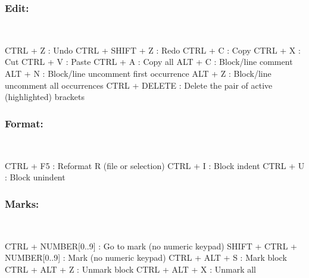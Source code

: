 \newpage
\subsubsection{Edit:}\\

\vspace{-0.5cm}
\begin{Rtables}[caption={[Edit menu keyboard shortcuts]
    Edit menu keyboard shortcuts},
  label=menu:edit]
  CTRL + Z         : Undo
  CTRL + SHIFT + Z : Redo
  CTRL + C         : Copy
  CTRL + X         : Cut
  CTRL + V         : Paste
  CTRL + A         : Copy all
  ALT  + C         : Block/line comment
  ALT  + N         : Block/line uncomment first occurrence
  ALT  + Z         : Block/line uncomment all occurrences
  CTRL + DELETE    : Delete the pair of active (highlighted) brackets
\end{Rtables}

\subsubsection{Format:}\\

\vspace{-0.5cm}
\begin{Rtables}[caption={[Format menu keyboard shortcuts]
    Format menu keyboard shortcuts},
  label=menu:format]
  CTRL + F5 : Reformat R (file or selection)
  CTRL + I  : Block indent
  CTRL + U  : Block unindent
\end{Rtables}


\subsubsection{Marks:}\\

\vspace{-0.5cm}
\begin{Rtables}[caption={[Marks menu keyboard shortcuts]
    Marks menu keyboard shortcuts},
  label=menu:marks]
  CTRL  + NUMBER[0..9]        : Go to mark (no numeric keypad)
  SHIFT + CTRL + NUMBER[0..9] : Mark (no numeric keypad)
  CTRL  + ALT  + S            : Mark block
  CTRL  + ALT  + Z            : Unmark block
  CTRL  + ALT  + X            : Unmark all
\end{Rtables}


